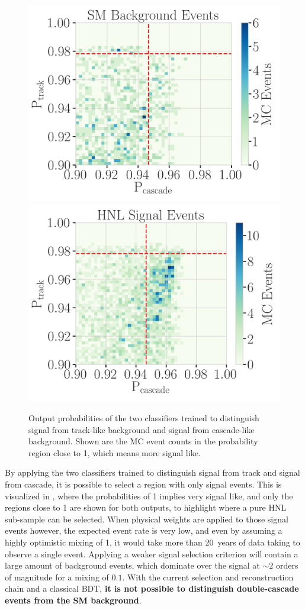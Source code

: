 \begin{figure}[h]
	\centering
    \includegraphics[width=0.49\linewidth]{figures/results/190607/classification/cascade_vs_track_class_prob_background_full_stats.png}
    \includegraphics[width=0.49\linewidth]{figures/results/190607/classification/cascade_vs_track_class_prob_hnl_full_stats.png}
    \caption[Double-cascade classifier probabilities]{Output probabilities of the two classifiers trained to distinguish signal from track-like background and signal from cascade-like background. Shown are the MC event counts in the probability region close to 1, which means more signal like.}
\end{figure}

By applying the two classifiers trained to distinguish signal from track and signal from cascade, it is possible to select a region with only signal events. This is visualized in , where the probabilities of 1 implies very signal like, and only the regions close to 1 are shown for both outputs, to highlight where a pure HNL sub-sample can be selected. When physical weights are applied to those signal events however, the expected event rate is very low, and even by assuming a highly optimistic mixing of 1, it would take more than \SI{20}{years} of data taking to observe a single event. Applying a weaker signal selection criterion will contain a large amount of background events, which dominate over the signal at $\sim2$ orders of magnitude for a mixing of $0.1$. With the current selection and reconstruction chain and a classical BDT, \textbf{it is not possible to distinguish double-cascade events from the SM background}.


